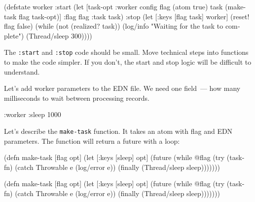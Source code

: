 \else

\begin{english}
  \begin{clojure}
(defstate worker
  :start
  (let [{task-opt :worker} config
        flag (atom true)
        task (make-task flag task-opt)]
    {:flag flag :task task})
  :stop
  (let [{:keys [flag task]} worker]
    (reset! flag false)
    (while (not (realized? task))
      (log/info "Waiting for the task to complete")
      (Thread/sleep 300))))
  \end{clojure}
\end{english}

\fi

The \verb|:start| and \verb|:stop| code should be small. Move technical steps into functions to make the code simpler. If you don't, the start and stop logic will be difficult to understand.

Let's add worker parameters to the EDN file. We need one field~--- how many milliseconds to wait between processing records.

\begin{english}
  \begin{clojure}
{:worker {:sleep 1000}}
  \end{clojure}
\end{english}


Let's describe the \verb|make-task| function. It takes an atom with flag and EDN parameters. The function will return a future with a loop:

\ifnarrow

\begin{english}
  \begin{clojure/lines}
(defn make-task
  [flag opt]
  (let [{:keys [sleep]} opt]
    (future
      (while @flag
        (try
          (task-fn)
          (catch Throwable e
            (log/error e))
          (finally
            (Thread/sleep
              sleep)))))))
  \end{clojure/lines}
\end{english}

\else

\begin{english}
  \begin{clojure/lines}
(defn make-task
  [flag opt]
  (let [{:keys [sleep]} opt]
    (future
      (while @flag
        (try
          (task-fn)
          (catch Throwable e
            (log/error e))
          (finally
            (Thread/sleep sleep)))))))
  \end{clojure/lines}
\end{english}

